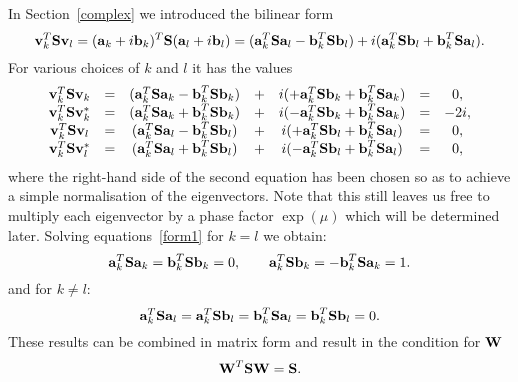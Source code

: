In Section~\ref{complex} we introduced the bilinear form
\begin{equation}
\bold{v}_k^T \bold{S} \bold{v}_l =
(\bold{a}_k + i \bold{b}_k)^T \bold{S} (\bold{a}_l + i \bold{b}_l) =
(\bold{a}_k^T \bold{S} \bold{a}_l - \bold{b}_k^T \bold{S} \bold{b}_l) +
i (\bold{a}_k^T \bold{S} \bold{b}_l + \bold{b}_k^T \bold{S} \bold{a}_l).
\end{equation}
For various choices of $k$ and $l$ it has the values
\begin{equation}\begin{array}{ccccccc}
\bold{v}_k^T \bold{S} \bold{v}_k &=&
(\bold{a}_k^T \bold{S} \bold{a}_k - \bold{b}_k^T \bold{S} \bold{b}_k) &+&
i (+ \bold{a}_k^T \bold{S} \bold{b}_k + \bold{b}_k^T \bold{S} \bold{a}_k)
&=& 0, \\
\bold{v}_k^T \bold{S} \bold{v}_k^* &=&
(\bold{a}_k^T \bold{S} \bold{a}_k + \bold{b}_k^T \bold{S} \bold{b}_k) &+&
i (- \bold{a}_k^T \bold{S} \bold{b}_k + \bold{b}_k^T \bold{S} \bold{a}_k)
&=& -2i, \\
\bold{v}_k^T \bold{S} \bold{v}_l &=&
(\bold{a}_k^T \bold{S} \bold{a}_l-\bold{b}_k^T \bold{S} \bold{b}_l) &+&
i (+ \bold{a}_k^T \bold{S} \bold{b}_l+\bold{b}_k^T \bold{S} \bold{a}_l)
&=& 0, \\
\bold{v}_k^T \bold{S} \bold{v}_l^* &=&
(\bold{a}_k^T \bold{S} \bold{a}_l+\bold{b}_k^T \bold{S} \bold{b}_l) &+&
i (- \bold{a}_k^T \bold{S} \bold{b}_l+\bold{b}_k^T \bold{S} \bold{a}_l)
&=& 0,
\end{array}\label{form1}\end{equation}
where the right-hand side of the second equation has been chosen
so as to achieve a simple normalisation of the eigenvectors.
Note that this still leaves us free to multiply each eigenvector by a
phase factor $\exp(\mu)$ which will be determined later.
Solving equations~\ref{form1} for $k = l$ we obtain:
\begin{equation}
\bold{a}_k^T \bold{S} \bold{a}_k = \bold{b}_k^T \bold{S} \bold{b}_k = 0, \qquad
\bold{a}_k^T \bold{S} \bold{b}_k = - \bold{b}_k^T \bold{S} \bold{a}_k = 1.
\end{equation}
and for $k \ne l$:
\begin{equation}
\bold{a}_k^T \bold{S} \bold{a}_l = \bold{a}_k^T \bold{S} \bold{b}_l =
\bold{b}_k^T \bold{S} \bold{a}_l = \bold{b}_k^T \bold{S} \bold{b}_l = 0.
\end{equation}
These results can be combined in matrix form and result in the
condition for $\bold{W}$
\begin{equation}
\bold{W}^T \bold{S} \bold{W} = \bold{S}.
\end{equation}
